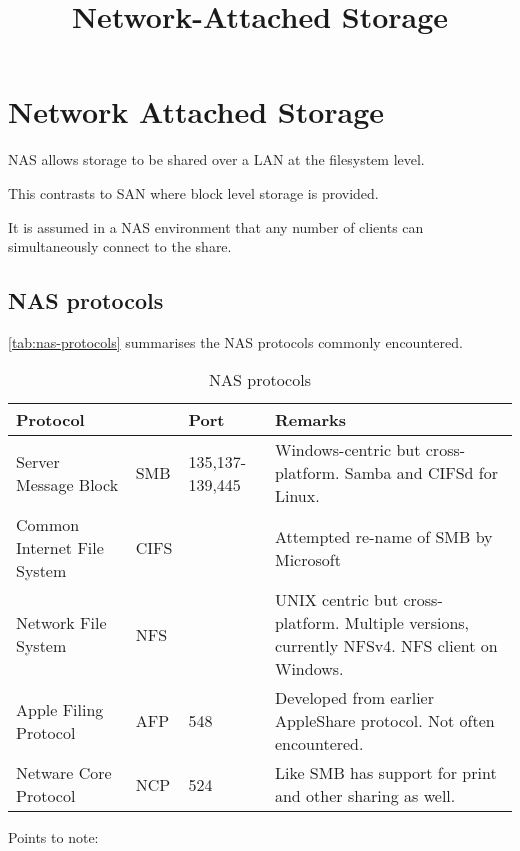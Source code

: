 \documentclass[slides]{pgnotes}
\title{Network-Attached Storage}
\begin{document}
\maketitle

\tableofcontents

\section{Network Attached Storage}\label{network-attached-storage}

NAS allows storage to be shared over a LAN at the filesystem level.

This contrasts to SAN where block level storage is provided.

It is assumed in
a NAS environment that any number of clients can simultaneously connect
to the share.


\subsection{NAS protocols}
\label{sec:nas-protocols}

\autoref{tab:nas-protocols} summarises the NAS protocols commonly encountered.

\begin{table}[htbp]
  \begin{tabularx}{1.0\linewidth}{l l l X}
    \toprule
    \textbf{Protocol} & ~ & \textbf{Port} & \textbf{Remarks} \\
    \midrule
    Server Message Block & SMB & 135,137-139,445 & Windows-centric but cross-platform. Samba and CIFSd for Linux.\\
    Common Internet File System & CIFS & ~ & Attempted re-name of SMB by Microsoft\\
    Network File System & NFS & ~ & UNIX centric but cross-platform. Multiple versions, currently NFSv4. NFS client on Windows.\\
    Apple Filing Protocol & AFP & 548 & Developed from earlier AppleShare protocol. Not often encountered.\\
    Netware Core Protocol & NCP & 524 & Like SMB has support for print and other sharing as well.\\
    \bottomrule
  \end{tabularx}
  \caption{NAS protocols}
  \label{tab:nas-protocols}
\end{table}

Points to note:
\end{document}
